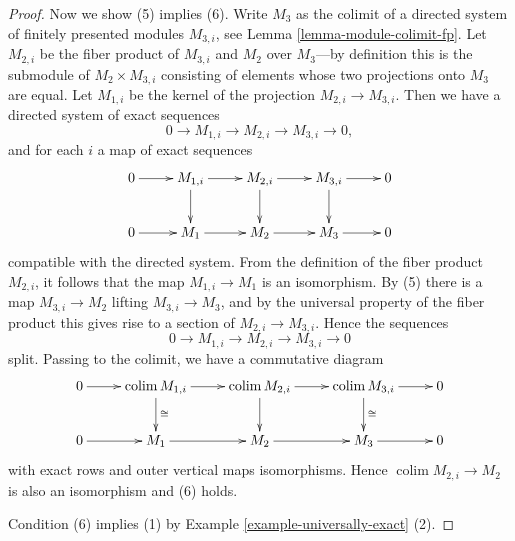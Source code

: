 \documentclass{amsart}
\theoremstyle{plain}
\theoremstyle{definition}
\theoremstyle{remark}
\numberwithin{equation}{subsection}
\def\colim{\mathop{\mathrm{colim}}\nolimits}
\begin{document}
\begin{proof}
\medskip\noindent
Now we show (5) implies (6). Write $M_{3}$ as the colimit of a directed system
of finitely presented modules $M_{3, i}$, see
Lemma \ref{lemma-module-colimit-fp}. Let $M_{2, i}$ be the fiber product
of $M_{3, i}$ and $M_{2}$ over $M_{3}$---by definition this is the submodule of
$M_2 \times M_{3, i}$ consisting of elements whose two projections onto $M_3$
are equal. Let $M_{1, i}$ be the kernel of the projection
$M_{2, i} \to M_{3, i}$. Then we have a directed system of exact sequences
$$
0 \to M_{1, i} \to M_{2, i} \to M_{3, i} \to 0,
$$
and for each $i$ a map of exact sequences
$$
\xymatrix{
0  \ar[r] & M_{1, i} \ar[d] \ar[r]  &  M_{2, i}  \ar[r] \ar[d] & M_{3, i} \ar[d]
\ar[r] & 0 \\
0  \ar[r] & M_{1} \ar[r]  &  M_{2}  \ar[r] & M_{3} \ar[r] & 0
}
$$
compatible with the directed system.  From the definition of the fiber product
$M_{2, i}$, it follows that the map $M_{1, i} \to M_1$ is an isomorphism.
 By (5) there is a map $M_{3, i} \to M_{2}$ lifting $M_{3, i} \to
M_3$, and by the universal property of the fiber product this gives rise to a
section of $M_{2, i} \to M_{3, i}$.  Hence the sequences
$$
0 \to M_{1, i} \to M_{2, i} \to M_{3, i} \to 0
$$
split.  Passing to the colimit, we have a commutative diagram
$$
\xymatrix{
0  \ar[r] & \colim M_{1, i} \ar[d]^{\cong} \ar[r]  &  \colim M_{2, i}
 \ar[r]
\ar[d] & \colim M_{3, i} \ar[d]^{\cong} \ar[r] & 0 \\
0  \ar[r] & M_{1} \ar[r]  &  M_{2}  \ar[r] & M_{3} \ar[r] & 0
}
$$
with exact rows and outer vertical maps isomorphisms.  Hence $\colim
M_{2, i}
\to M_2$ is also an isomorphism and (6) holds.

\medskip\noindent
Condition (6) implies (1) by
Example \ref{example-universally-exact} (2).
\end{proof}
\end{document}
